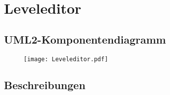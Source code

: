 \section{Leveleditor}

	\subsection{UML2-Komponentendiagramm}
		\newpage
		\begin{figure}[H]
    		\centering
    		 \texttt{[image: Leveleditor.pdf]}
		\end{figure}

	\subsection{Beschreibungen}

